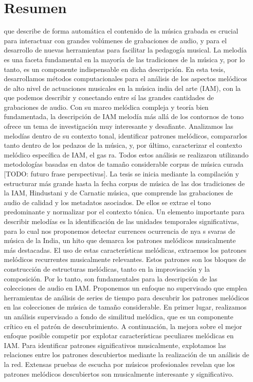 
\chapter{Resumen}

que describe de forma automática el contenido de la música grabada es crucial para interactuar con grandes volúmenes de grabaciones de audio, y para el desarrollo de nuevas herramientas para facilitar la pedagogía musical. La melodía es una faceta fundamental en la mayoría de las tradiciones de la música y, por lo tanto, es un componente indispensable en dicha descripción. En esta tesis, desarrollamos métodos computacionales para el análisis de los aspectos melódicos de alto nivel de actuaciones musicales en la música india del arte (IAM), con la que podemos describir y conectando entre sí las grandes cantidades de grabaciones de audio. Con su marco melódica compleja y teoría bien fundamentada, la descripción de IAM melodía más allá de los contornos de tono ofrece un tema de investigación muy interesante y desafiante. Analizamos las melodías dentro de su contexto tonal, identificar patrones melódicos, compararlos tanto dentro de los pedazos de la música, y, por último, caracterizar el contexto melódico específica de IAM, el gas ra. Todos estos análisis se realizaron utilizando metodologías basadas en datos de tamaño considerable corpus de música curada [TODO: futuro frase perspectivas].
La tesis se inicia mediante la compilación y estructurar más grande hasta la fecha corpus de música de las dos tradiciones de la IAM, Hindustani y de Carnatic música, que comprende las grabaciones de audio de calidad y los metadatos asociados. De ellos se extrae el tono predominante y normalizar por el contexto tónica. Un elemento importante para describir melodías es la identificación de las unidades temporales significativas, para lo cual nos proponemos detectar currences ocurrencia de nya s svaras de música de la India, un hito que demarca los patrones melódicos musicalmente más destacadas.
El uso de estas características melódicas, extraemos los patrones melódicos recurrentes musicalmente relevantes. Estos patrones son los bloques de construcción de estructuras melódicas, tanto en la improvisación y la composición. Por lo tanto, son fundamentales para la descripción de las colecciones de audio en IAM. Proponemos un enfoque no supervisado que emplea herramientas de análisis de series de tiempo para descubrir los patrones melódicos en las colecciones de música de tamaño considerable. En primer lugar, realizamos un análisis supervisado a fondo de similitud melódica, que es un componente crítico en el patrón de descubrimiento. A continuación, la mejora sobre el mejor enfoque posible competir por explotar características peculiares melódicas en IAM. Para identificar patrones significativos musicalmente, explotamos las relaciones entre los patrones descubiertos mediante la realización de un análisis de la red. Extensas pruebas de escucha por músicos profesionales revelan que los patrones melódicos descubiertos son musicalmente interesante y significativo.

